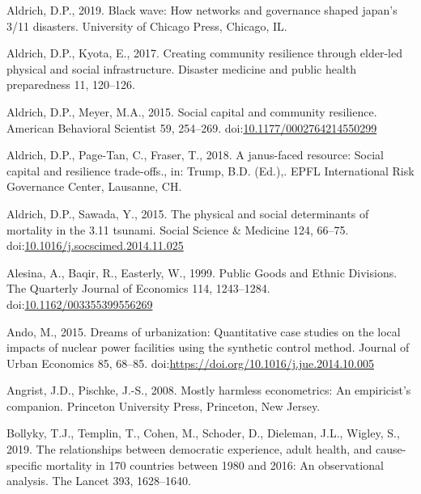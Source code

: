\documentclass[]{elsarticle} %
\newlength{\cslhangindent}
\newlength{\cslentryspacingunit} %
\newenvironment{CSLReferences}[2] %
 {%
  \setlength{\parindent}{0pt}
  \ifodd #1
  \let\oldpar\par
  \def\par{\hangindent=\cslhangindent\oldpar}
  \fi
  \setlength{\parskip}{#2\cslentryspacingunit}
 }%
 {}
\begin{document}
\begin{CSLReferences}{1}{0}
\leavevmode{}%
Aldrich, D.P., 2019. Black wave: How networks and governance shaped
japan's 3/11 disasters. University of Chicago Press, Chicago, IL.

\leavevmode{}%
Aldrich, D.P., Kyota, E., 2017. Creating community resilience through
elder-led physical and social infrastructure. Disaster medicine and
public health preparedness 11, 120--126.

\leavevmode{}%
Aldrich, D.P., Meyer, M.A., 2015. Social capital and community
resilience. American Behavioral Scientist 59, 254--269.
doi:\href{https://doi.org/10.1177/0002764214550299}{10.1177/0002764214550299}

\leavevmode{}%
Aldrich, D.P., Page-Tan, C., Fraser, T., 2018. A janus-faced resource:
Social capital and resilience trade-offs., in: Trump, B.D. (Ed.),. EPFL
International Risk Governance Center, Lausanne, CH.

\leavevmode{}%
Aldrich, D.P., Sawada, Y., 2015. The physical and social determinants of
mortality in the 3.11 tsunami. Social Science \& Medicine 124, 66--75.
doi:\href{https://doi.org/10.1016/j.socscimed.2014.11.025}{10.1016/j.socscimed.2014.11.025}

\leavevmode{}%
Alesina, A., Baqir, R., Easterly, W., 1999. {Public Goods and Ethnic
Divisions}. The Quarterly Journal of Economics 114, 1243--1284.
doi:\href{https://doi.org/10.1162/003355399556269}{10.1162/003355399556269}

\leavevmode{}%
Ando, M., 2015. Dreams of urbanization: Quantitative case studies on the
local impacts of nuclear power facilities using the synthetic control
method. Journal of Urban Economics 85, 68--85.
doi:\url{https://doi.org/10.1016/j.jue.2014.10.005}

\leavevmode{}%
Angrist, J.D., Pischke, J.-S., 2008. Mostly harmless econometrics: An
empiricist's companion. Princeton University Press, Princeton, New
Jersey.

\leavevmode{}%
Bollyky, T.J., Templin, T., Cohen, M., Schoder, D., Dieleman, J.L.,
Wigley, S., 2019. The relationships between democratic experience, adult
health, and cause-specific mortality in 170 countries between 1980 and
2016: An observational analysis. The Lancet 393, 1628--1640.


\end{CSLReferences}
\end{document}
